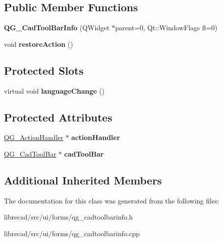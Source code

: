 \subsection*{Public Member Functions}
\begin{DoxyCompactItemize}
\item 
\hypertarget{classQG__CadToolBarInfo_a91b38525ef98d7c867770793ea2fee6d}{{\bfseries Q\-G\-\_\-\-Cad\-Tool\-Bar\-Info} (Q\-Widget $\ast$parent=0, Qt\-::\-Window\-Flags fl=0)}\label{classQG__CadToolBarInfo_a91b38525ef98d7c867770793ea2fee6d}

\item 
\hypertarget{classQG__CadToolBarInfo_aaf42d9366518fcfcde5b27998adc7685}{void {\bfseries restore\-Action} ()}\label{classQG__CadToolBarInfo_aaf42d9366518fcfcde5b27998adc7685}

\end{DoxyCompactItemize}
\subsection*{Protected Slots}
\begin{DoxyCompactItemize}
\item 
\hypertarget{classQG__CadToolBarInfo_ae3a8ffd6a723857aeef4347b5a8a606c}{virtual void {\bfseries language\-Change} ()}\label{classQG__CadToolBarInfo_ae3a8ffd6a723857aeef4347b5a8a606c}

\end{DoxyCompactItemize}
\subsection*{Protected Attributes}
\begin{DoxyCompactItemize}
\item 
\hypertarget{classQG__CadToolBarInfo_ae00e66883fc16a3b12108bd6dca6401c}{\hyperlink{classQG__ActionHandler}{Q\-G\-\_\-\-Action\-Handler} $\ast$ {\bfseries action\-Handler}}\label{classQG__CadToolBarInfo_ae00e66883fc16a3b12108bd6dca6401c}

\item 
\hypertarget{classQG__CadToolBarInfo_abf242dfc4736d31d152a4dade369aa15}{\hyperlink{classQG__CadToolBar}{Q\-G\-\_\-\-Cad\-Tool\-Bar} $\ast$ {\bfseries cad\-Tool\-Bar}}\label{classQG__CadToolBarInfo_abf242dfc4736d31d152a4dade369aa15}

\end{DoxyCompactItemize}
\subsection*{Additional Inherited Members}


The documentation for this class was generated from the following files\-:\begin{DoxyCompactItemize}
\item 
librecad/src/ui/forms/qg\-\_\-cadtoolbarinfo.\-h\item 
librecad/src/ui/forms/qg\-\_\-cadtoolbarinfo.\-cpp\end{DoxyCompactItemize}
